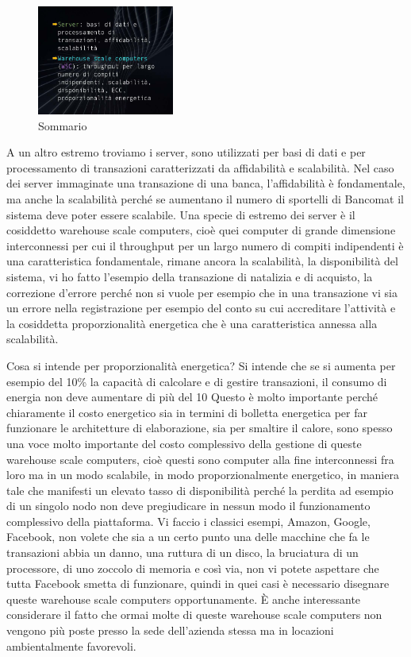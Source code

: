 
\FloatBarrier
\begin{figure}[H]
  \centering
  \includegraphics[width=0.40\textwidth,
                    trim=40 80 10 40, %
                    clip]
                    {images/Lez03_p01_fig_05.png}
  \caption{Sommario}
  \label{fig:Lez03_p01_fig_05}
\end{figure}
\FloatBarrier
\noindent

A un altro estremo troviamo i server, sono utilizzati per basi di dati e per processamento di transazioni caratterizzati da affidabilità e scalabilità.
Nel caso dei server immaginate una transazione di una banca, l'affidabilità è fondamentale, ma anche la scalabilità perché se aumentano il numero di sportelli di Bancomat il sistema deve poter essere scalabile.
Una specie di estremo dei server è il cosiddetto warehouse scale computers, cioè quei computer di grande dimensione interconnessi per cui il throughput per un largo numero di compiti indipendenti è una caratteristica fondamentale, rimane ancora la scalabilità, la disponibilità del sistema, vi ho fatto l'esempio della transazione di natalizia e di acquisto, la correzione d'errore perché non si vuole per esempio che in una transazione vi sia un errore nella registrazione per esempio del conto su cui accreditare l'attività e la cosiddetta proporzionalità energetica che è una caratteristica annessa alla scalabilità.

Cosa si intende per proporzionalità energetica?
Si intende che se si aumenta per esempio del 10\% la capacità di calcolare e di gestire transazioni, il consumo di energia non deve aumentare di più del 10%
Questo è molto importante perché chiaramente il costo energetico sia in termini di bolletta energetica per far funzionare le architetture di elaborazione, sia per smaltire il calore, sono spesso una voce molto importante del costo complessivo della gestione di queste warehouse scale computers, cioè questi sono computer alla fine interconnessi fra loro ma in un modo scalabile, in modo proporzionalmente energetico, in maniera tale che manifesti un elevato tasso di disponibilità perché la perdita ad esempio di un singolo nodo non deve pregiudicare in nessun modo il funzionamento complessivo della piattaforma.
Vi faccio i classici esempi, Amazon, Google, Facebook, non volete che sia a un certo punto una delle macchine che fa le transazioni abbia un danno, una ruttura di un disco, la bruciatura di un processore, di uno zoccolo di memoria e così via, non vi potete aspettare che tutta Facebook smetta di funzionare, quindi in quei casi è necessario disegnare queste warehouse scale computers opportunamente.
È anche interessante considerare il fatto che ormai molte di queste warehouse scale computers non vengono più poste presso la sede dell'azienda stessa ma in locazioni ambientalmente favorevoli.

